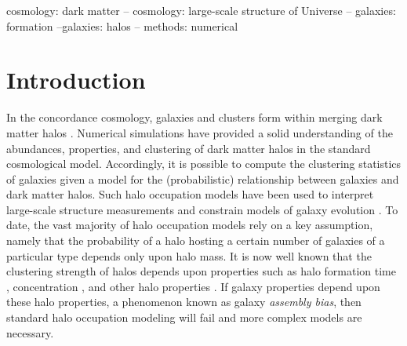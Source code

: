 \documentclass[usenatbib,usegraphicx,letterpaper]{mn2e}
\begin{document}
\begin{keywords}
cosmology: dark matter -- cosmology: large-scale structure of Universe -- galaxies: formation --galaxies: halos -- methods: numerical
\end{keywords}




\section{Introduction}
\label{section:introduction}

In the concordance cosmology, galaxies and clusters form within merging dark matter halos \citep[e.g.,][]{white78,
blumenthal84}. Numerical simulations have provided a solid understanding of the abundances, properties, and 
clustering of dark matter halos in the standard cosmological model. Accordingly, it is possible to compute the 
clustering statistics of galaxies given a model for the (probabilistic) relationship between galaxies and dark matter halos. 
Such halo occupation models have been used to interpret large-scale structure measurements and 
constrain models of galaxy evolution \citep[e.g.,][]{yang03,tinker05,zehavi05a,porciani06,vdBosch07,Zheng07,conroy_wechsler09,yang09b,zehavi_etal11,guo_etal11b,wake_etal11,yang11a,yang12,leauthaud_etal12,rod_puebla12,tinker_etal13,cacciato_etal13,more_etal13,guo_etal14,zu_mandelbaum15b}.
To date, the vast majority of halo occupation models rely on a key assumption, namely that 
the probability of a halo hosting a certain number of galaxies of a particular type 
depends only upon halo mass. It is now well known that the clustering strength of halos depends upon 
properties such as halo formation time \citep{gao05,wechsler06,gao_white07,croton07,zentner07,dalal_etal08}, 
concentration \citep{wechsler06,mao15}, and other halo properties . 
If galaxy properties depend upon these halo properties, a phenomenon known as galaxy {\em assembly bias}, 
then standard halo occupation modeling will fail \citep[e.g.,][]{zentner_etal14} 
and more complex models \citep[e.g.,][]{hearin_etal16} are necessary.
\end{document}

